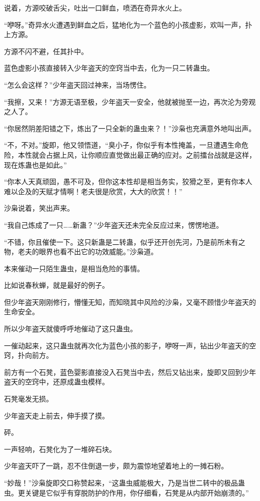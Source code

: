 \begin{this_body}
说着，方源咬破舌尖，吐出一口鲜血，喷洒在奇异水火上。

“咿呀。”奇异水火遭遇到鲜血之后，猛地化为一个蓝色的小孩虚影，欢叫一声，扑上方源。

方源不闪不避，任其扑中。

蓝色虚影小孩直接转入少年盗天的空窍当中去，化为一只二转蛊虫。

“怎么会这样？”少年盗天回过神来，当场愣住。

“我擦，又来！”方源无语至极，少年盗天一安全，他就被抛至一边，再次沦为旁观之人了。

“你居然阴差阳错之下，炼出了一只全新的蛊虫来？！”沙枭也充满意外地叫出声。

“不，不对。”旋即，他又领悟道，“臭小子，你似乎有本性掩盖，一旦遭遇生命危险，本性就会占据上风，让你顺应直觉做出最正确的应对。之前擂台战就是这样，现在炼蛊也是如此。”

“你本人天真顽固，愚不可及，但你这本性却是相当务实，狡猾之至，更有你本人难以企及的天赋才情啊！老夫很是欣赏，大大的欣赏！！”

沙枭说着，笑出声来。

“我自己炼成了一只……新蛊？”少年盗天还未完全反应过来，愣愣地道。

“不错，你且催使一下。这只新蛊是二转蛊，似乎还开创先河，乃是前所未有之物，老夫的眼界也看不出它的功效威能。”沙枭道。

本来催动一只陌生蛊虫，是相当危险的事情。

比如说春秋蝉，就是最好的例子。

但少年盗天刚刚修行，懵懂无知，而知晓其中风险的沙枭，又毫不顾惜少年盗天的生命安全。

所以少年盗天就傻呼呼地催动了这只蛊虫。

一催动起来，这只蛊虫就再次化为蓝色小孩的影子，咿呀一声，钻出少年盗天的空窍，扑向前方。

前方有一个石凳，蓝色婴影直接没入石凳当中去，然后又钻出来，旋即又回到少年盗天的空窍中，还原成蛊虫模样。

石凳毫发无损。

少年盗天走上前去，伸手摸了摸。

砰。

一声轻响，石凳化为了一堆碎石块。

少年盗天吓了一跳，忍不住倒退一步，颇为震惊地望着地上的一摊石粉。

“妙哉！”沙枭旋即交口称赞起来，“这蛊虫威能极大，乃是当世二转中的极品蛊虫。更关键是它似乎有穿脱防护的作用，你仔细看，石凳是从内部开始崩溃的。”


\end{this_body}
